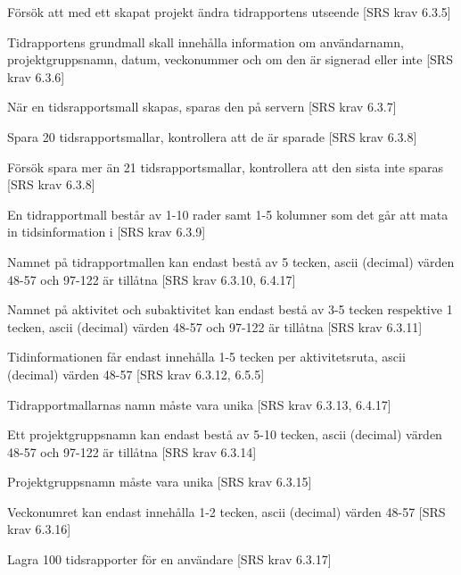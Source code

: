 \documentclass[a4paper]{article}
\begin{document}
\begin{appendices}
\begin{FT}
\item
Försök att med ett skapat projekt ändra tidrapportens utseende [SRS krav 6.3.5]

\item
Tidrapportens grundmall skall innehålla information om användarnamn, projektgruppsnamn, datum, veckonummer och om den är signerad eller inte [SRS krav 6.3.6]

\item
När en tidsrapportsmall skapas, sparas den på servern [SRS krav 6.3.7]

\item
Spara 20 tidsrapportsmallar, kontrollera att de är sparade [SRS krav 6.3.8]

\item
Försök spara mer än 21 tidsrapportsmallar, kontrollera att den sista inte sparas [SRS krav 6.3.8]

\item
En tidrapportmall består av 1-10 rader samt 1-5 kolumner som det går att mata in tidsinformation i [SRS krav 6.3.9]

\item
Namnet på tidrapportmallen kan endast bestå av 5 tecken, ascii (decimal) värden 48-57 och
97-122 är tillåtna [SRS krav 6.3.10, 6.4.17]

\item
Namnet på aktivitet och subaktivitet kan endast bestå av 3-5 tecken respektive 1 tecken, ascii (decimal) värden 48-57 och 97-122 är tillåtna [SRS krav 6.3.11]

\item
Tidinformationen får endast innehålla 1-5 tecken per aktivitetsruta, ascii (decimal) värden 48-57 [SRS krav 6.3.12, 6.5.5]

\item
Tidrapportmallarnas namn måste vara unika [SRS krav 6.3.13, 6.4.17]

\item
Ett projektgruppsnamn kan endast bestå av 5-10 tecken, ascii (decimal) värden 48-57 och
97-122 är tillåtna [SRS krav 6.3.14]

\item
Projektgruppsnamn måste vara unika [SRS krav 6.3.15]

\item
Veckonumret kan endast innehålla 1-2 tecken, ascii (decimal) värden 48-57 [SRS krav 6.3.16]

\item
Lagra 100 tidsrapporter för en användare [SRS krav 6.3.17]


\end{FT}
\end{appendices}
\end{document}
